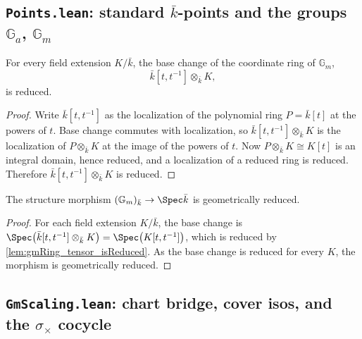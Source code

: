\subsection*{\texttt{Points.lean}: standard \(\bar k\)-points and the groups \(\mathbb G_a\), \(\mathbb G_m\)}
\begin{lemma}
  \label{lem:gmRing_tensor_isReduced}
  For every field extension \(K/\bar k\), the base change of the coordinate ring of
  \(\mathbb G_m\),
  \[ \bar k[t, t^{-1}] \otimes_{\bar k} K, \]
  is reduced.
\end{lemma}
\begin{proof}\leanok
  Write \(\bar k[t, t^{-1}]\) as the localization of the polynomial ring \(P = \bar k[t]\) at the
  powers of \(t\). Base change commutes with localization, so
  \(\bar k[t, t^{-1}] \otimes_{\bar k} K\) is the localization of \(P \otimes_{\bar k} K\) at the
  image of the powers of \(t\). Now \(P \otimes_{\bar k} K \cong K[t]\) is an integral domain,
  hence reduced, and a localization of a reduced ring is reduced. Therefore
  \(\bar k[t, t^{-1}] \otimes_{\bar k} K\) is reduced.
\end{proof}
\begin{lemma}
  \label{lem:gm_geometricallyReduced}
  The structure morphism \((\mathbb G_m)_{\bar k} \to \Spec \bar k\) is geometrically reduced.
\end{lemma}
\begin{proof}\leanok
  For each field extension \(K/\bar k\), the base change is
  \(\Spec\bigl(\bar k[t, t^{-1}] \otimes_{\bar k} K\bigr) = \Spec\bigl(K[t, t^{-1}]\bigr)\), which
  is reduced by \cref{lem:gmRing_tensor_isReduced}. As the base change is reduced for every \(K\),
  the morphism is geometrically reduced.
\end{proof}


\subsection*{\texttt{GmScaling.lean}: chart bridge, cover isos, and the \(\sigma_\times\) cocycle}

